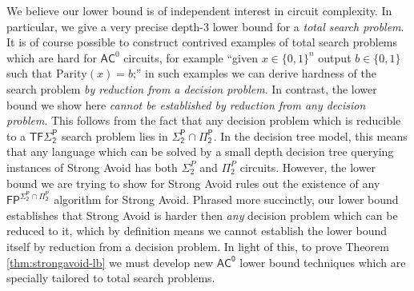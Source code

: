 \documentclass[11pt]{article}
\newtheorem{theorem}{Theorem}
\newcommand{\todo}[1]{\textcolor{red}{TODO: #1}}
\newcommand{\B}{\{0,1\}}
\newcommand{\rng}{\mathrm{range}}
\begin{document}

We believe our lower bound is of independent interest in %
circuit complexity. In particular, we give a very precise depth-3 lower bound for a \emph{total search problem}. It is of course possible to construct contrived examples of total search problems which are hard for $\mathsf{AC}^0$ circuits, for example ``given $x \in \B^n$ output $b \in \B$ such that $\mathrm{Parity}(x)=b$;'' in such examples we can derive hardness of the search problem \emph{by reduction from a decision problem}. In contrast, the lower bound we show here \emph{cannot be established by reduction from any decision problem}. This follows from the fact that any decision problem which is reducible to a $\mathsf{TF\Sigma_2^P}$ search problem lies in $\mathsf{\Sigma_2^P \cap \Pi_2^P}$. In the decision tree model, this means that any language which can be solved by a small depth decision tree querying instances of Strong Avoid has both $\Sigma_2^P$ and $\Pi_2^P$ circuits. However, the lower bound we are trying to show for Strong Avoid rules out the existence of any $\mathsf{FP^{\Sigma_2^P \cap \Pi_2^P}}$ algorithm for Strong Avoid. Phrased more succinctly, our lower bound establishes that Strong Avoid is harder then \emph{any} decision problem which can be reduced to it, which by definition means we cannot establish the lower bound itself by reduction from a decision problem. In light of this, to prove Theorem \ref{thm:strongavoid-lb} we must develop new $\mathsf{AC^0}$ lower bound techniques which are specially tailored to total search problems.

\end{document}
